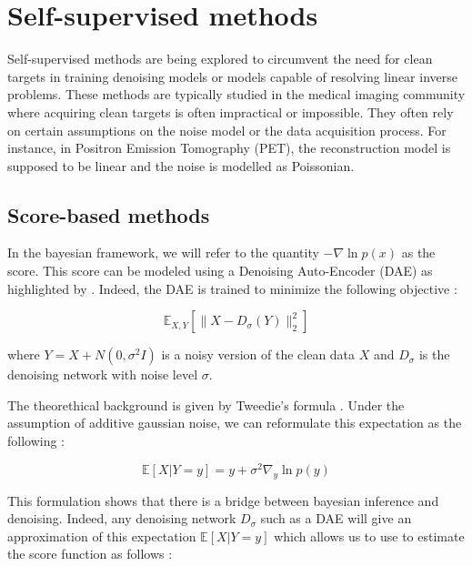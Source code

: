 \section{Self-supervised methods}

Self-supervised methods are being explored to circumvent the need for clean targets in training denoising models or models capable of resolving linear inverse problems.
These methods are typically studied in the medical imaging community where acquiring clean targets is often impractical or impossible.
They often rely on certain assumptions on the noise model or the data acquisition process.
For instance, in Positron Emission Tomography (PET), the reconstruction model is supposed to be linear and the noise is modelled as Poissonian.

\subsection{Score-based methods}

In the bayesian framework, we will refer to the quantity $-\nabla \ln p(x)$ as the score. This score can be modeled using a Denoising Auto-Encoder (DAE) as highlighted by .
Indeed, the DAE is trained to minimize the following objective :

\begin{equation}
    \mathbb{E}_{X, Y}\left[\|X - D_{\sigma}(Y)\|_2^2\right]
\end{equation}

where $Y = X + N(0, \sigma^2 I)$ is a noisy version of the clean data $X$ and $D_{\sigma}$ is the denoising network with noise level $\sigma$.




The theorethical background is given by Tweedie's formula \cite{efron_tweedies_2011}. Under the assumption of additive gaussian noise, we can reformulate this expectation as the following :

\begin{equation}
    \mathbb{E}\left[X | Y = y\right] = y + \sigma^2 \nabla_y \ln p(y)
\end{equation}

This formulation shows that there is a bridge between bayesian inference and denoising. Indeed, any denoising network $D_{\sigma}$ such as a DAE will give an approximation of this expectation $\mathbb{E}\left[X | Y = y\right]$ which allows us to use to estimate the score function as follows :

